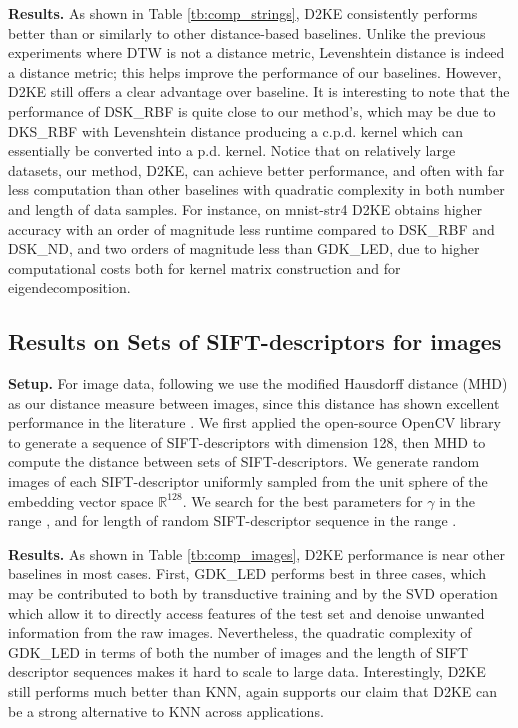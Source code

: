 \documentclass{article}
\newcommand{\R}{\mathbb{R}}
\newcommand{\1}{\mathbf{1}}
\begin{document}
\textbf{Results.} As shown in Table \ref{tb:comp_strings}, D2KE consistently performs better than or similarly to other distance-based baselines. Unlike the previous experiments where DTW is not a distance metric, Levenshtein distance is indeed a distance metric; this helps improve the performance of our baselines. However, D2KE still offers a clear advantage over baseline. It is interesting to note that the performance of DSK\_RBF is quite close to our method's, which may be due to DKS\_RBF with Levenshtein distance producing a c.p.d. kernel which can essentially be converted into a p.d. kernel. Notice that on relatively large datasets, our method, D2KE, can achieve better performance, and often with far less computation than other baselines with quadratic complexity in both number and length of data samples. For instance, on mnist-str4 D2KE obtains higher accuracy with an order of magnitude less runtime compared to DSK\_RBF and DSK\_ND, and two orders of magnitude less than GDK\_LED, due to higher computational costs both for kernel matrix construction and for eigendecomposition. 


\subsection{Results on Sets of SIFT-descriptors for images }
\label{{App:Results on Sets of SIFT-descriptors for images }}
\textbf{Setup.} For image data, following \cite{pekalska2001generalized,haasdonk2004learning} we use the modified Hausdorff distance (MHD) \cite{dubuisson1994modified} as our distance measure between images, since this distance has shown excellent performance in the literature \cite{sezgin2004survey, gao20123}. We first applied the open-source OpenCV library to generate a sequence of SIFT-descriptors with dimension 128, then MHD to compute the distance between sets of SIFT-descriptors. We generate random images of each SIFT-descriptor uniformly sampled from the unit sphere of the embedding vector space $\R^{128}$. We search for the best parameters for  $\gamma$ in the range \text{[1e-3 1e1]}, and for length of random SIFT-descriptor sequence in the range \text{[3 15]}.

\textbf{Results.} As shown in Table \ref{tb:comp_images}, D2KE performance is near other baselines in most cases. First, GDK\_LED performs best in three cases, which may be contributed to both by transductive training and by the SVD operation which allow it to  directly access features of the test set and denoise unwanted information from the raw images. Nevertheless, the quadratic complexity of GDK\_LED in terms of both the number of images and the length of SIFT descriptor sequences makes it hard to scale to large data. Interestingly, D2KE still performs much better than KNN, again supports our claim that D2KE can be a strong alternative to KNN across applications.
\end{document}
